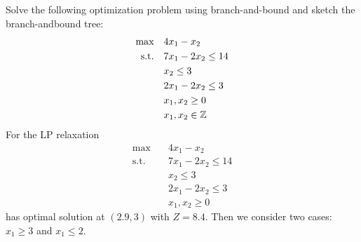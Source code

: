\documentclass{homework}
\begin{document}
\exercise
Solve the following optimization problem using branch-and-bound and sketch the branch-andbound tree:
\begin{align*}
	\text{max} \quad
	&4x_1 - x_2 \\
	\text{s.t.} \quad
	&7x_1 - 2x_2 \leq 14 \\
	&x_2 \leq 3 \\
	&2x_1 - 2x_2 \leq 3 \\
	&x_1, x_2 \geq 0 \\
	&x_1, x_2 \in \mathbb Z
\end{align*}
For the LP relaxation
\begin{align*}
	\text{max} \quad
	&4x_1 - x_2 \\
	\text{s.t.} \quad
	&7x_1 - 2x_2 \leq 14 \\
	&x_2 \leq 3 \\
	&2x_1 - 2x_2 \leq 3 \\
	&x_1, x_2 \geq 0
\end{align*}
has optimal solution at $(2.9, 3)$ with $Z = 8.4$. Then we consider two cases: $x_1 \geq 3$ and $x_1 \leq 2.$
\end{document}
